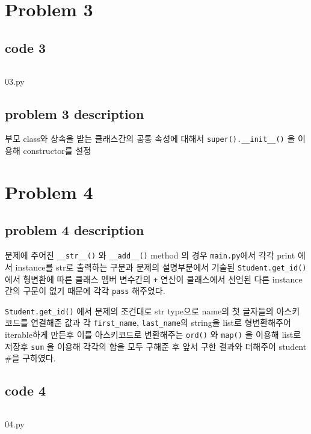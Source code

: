 \section*{Problem 3}
\vspace{-2mm}
    \subsection*{code 3}
        \begin{listing}[h!]
        \inputminted[framerule = 1pt,framesep = 2mm , frame = lines, fontsize=\footnotesize]{python}{./code/report_03/03.py}
        \vspace{-3mm}
        \caption{03.py}
        \end{listing}
    \vspace{-5mm}
    
    \subsection*{problem 3 description}
    부모 class와 상속을 받는 클래스간의 공통 속성에 대해서 \texttt{super().__init__()} 을 이용해 constructor를 설정
\section*{Problem 4}
\vspace{-2mm}    
    \subsection*{problem 4 description}
    문제에 주어진 \texttt{__str__()} 와 \texttt{__add__()} method 의 경우 \texttt{main.py}에서 각각 print 에서 instance를 str로 출력하는 구문과 문제의 설명부분에서 기술된 \texttt{Student.get_id()} 에서 형변환에 따른 클래스 멤버 변수간의 \texttt{+} 연산이 클래스에서 선언된 다른 instance간의 구문이 없기 때문에 각각 \texttt{pass} 해주었다.
    
    \texttt{Student.get_id()} 에서 문제의 조건대로 str type으로 name의 첫 글자들의 아스키 코드를 
    연결해준 값과 각 \texttt{first_name}, \texttt{last_name}의 string을 list로 형변환해주어 iterable하게 만든후 이를 아스키코드로 변환해주는 \texttt{ord()} 와 \texttt{map()} 을 이용해 list로 저장후 \texttt{sum} 을 이용해 각각의 합을 모두 구해준 후 앞서 구한 결과와 더해주어 
    student \#을 구하였다.
\clearpage
    \subsection*{code 4}
        \begin{listing}[h!]
        \inputminted[framerule = 1pt,framesep = 2mm , frame = lines, fontsize=\footnotesize]{python}{./code/report_03/04.py}
        \vspace{-3mm}
        \caption{04.py}
        \end{listing}
    \vspace{-5mm}
\clearpage
